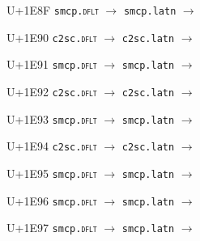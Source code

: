 \documentclass{article}
\begin{document}
\begin{substitutions}
\goodbreak

U+1E8F  \linebreak
    \texttt{smcp.\textsc{dflt}} $\to$  \linebreak
    \texttt{smcp.latn} $\to$  

\goodbreak

U+1E90  \linebreak
    \texttt{c2sc.\textsc{dflt}} $\to$  \linebreak
    \texttt{c2sc.latn} $\to$  

\goodbreak

U+1E91  \linebreak
    \texttt{smcp.\textsc{dflt}} $\to$  \linebreak
    \texttt{smcp.latn} $\to$  

\goodbreak

U+1E92  \linebreak
    \texttt{c2sc.\textsc{dflt}} $\to$  \linebreak
    \texttt{c2sc.latn} $\to$  

\goodbreak

U+1E93  \linebreak
    \texttt{smcp.\textsc{dflt}} $\to$  \linebreak
    \texttt{smcp.latn} $\to$  

\goodbreak

U+1E94  \linebreak
    \texttt{c2sc.\textsc{dflt}} $\to$  \linebreak
    \texttt{c2sc.latn} $\to$  

\goodbreak

U+1E95  \linebreak
    \texttt{smcp.\textsc{dflt}} $\to$  \linebreak
    \texttt{smcp.latn} $\to$  

\goodbreak

U+1E96  \linebreak
    \texttt{smcp.\textsc{dflt}} $\to$  \linebreak
    \texttt{smcp.latn} $\to$  

\goodbreak

U+1E97  \linebreak
    \texttt{smcp.\textsc{dflt}} $\to$  \linebreak
    \texttt{smcp.latn} $\to$  


\end{substitutions}
\end{document}
